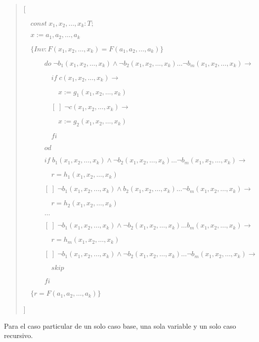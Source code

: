 \documentclass[hidelinks]{article}
\newenvironment{absolutelynopagebreak}
{\Needspace{10\baselineskip}\begin{quote}}
		{\end{quote}}
\begin{document}
\begin{absolutelynopagebreak}
	[\par
		$\quad const \; x_1,x_2,\dots,x_k: T;$\par
		$\quad x := a_1,a_2, \dots, a_k$\par
		$\quad \{Inv: F(x_1,x_2,\dots,x_k) = F(a_1,a_2, \dots, a_k)\}$\par
		$\qquad \quad do \; \neg b_1(x_1,x_2,\dots,x_k) \land \neg b_2(x_1,x_2,\dots,x_k) \dots \neg b_m(x_1,x_2,\dots,x_k) \rightarrow$ \par
		$\qquad \qquad if \;  c(x_1,x_2,\dots,x_k) \rightarrow$ \par
		$\qquad \qquad \quad x := g_1(x_1,x_2,\dots,x_k)$ \par
		$\qquad \qquad [\;] \; \neg c(x_1,x_2,\dots,x_k) \rightarrow$ \par
		$\qquad \qquad \quad x := g_2(x_1,x_2,\dots,x_k)$ \par
		$\qquad \qquad fi$ \par
		$\qquad \quad od$ \par
		$\qquad \quad if \; b_1(x_1,x_2,\dots,x_k) \land \neg b_2(x_1,x_2,\dots,x_k) \dots \neg b_m(x_1,x_2,\dots,x_k) \rightarrow$ \par
		$\qquad \qquad r = h_1(x_1,x_2,\dots,x_k)$\par
		$\qquad \quad [\;] \; \neg b_1(x_1,x_2,\dots,x_k) \land b_2(x_1,x_2,\dots,x_k) \dots \neg b_m(x_1,x_2,\dots,x_k) \rightarrow$ \par
		$\qquad \qquad r = h_2(x_1,x_2,\dots,x_k)$\par
		$\qquad \quad \dots$ \par
		$\qquad \quad [\;] \; \neg b_1(x_1,x_2,\dots,x_k) \land \neg b_2(x_1,x_2,\dots,x_k) \dots b_m(x_1,x_2,\dots,x_k) \rightarrow$ \par
		$\qquad \qquad r = h_m(x_1,x_2,\dots,x_k)$\par
		$\qquad \quad [\;] \; \neg b_1(x_1,x_2,\dots,x_k) \land \neg b_2(x_1,x_2,\dots,x_k) \dots \neg b_m(x_1,x_2,\dots,x_k) \rightarrow$ \par
		$\qquad \qquad skip$\par
		$\qquad \quad fi$ \par
		$\quad \{r =F(a_1,a_2, \dots, a_k)\}$ \par
	]\par
\end{absolutelynopagebreak}\par

Para el caso particular de un solo caso base, una sola variable y un solo caso
recursivo.\par
\end{document}
